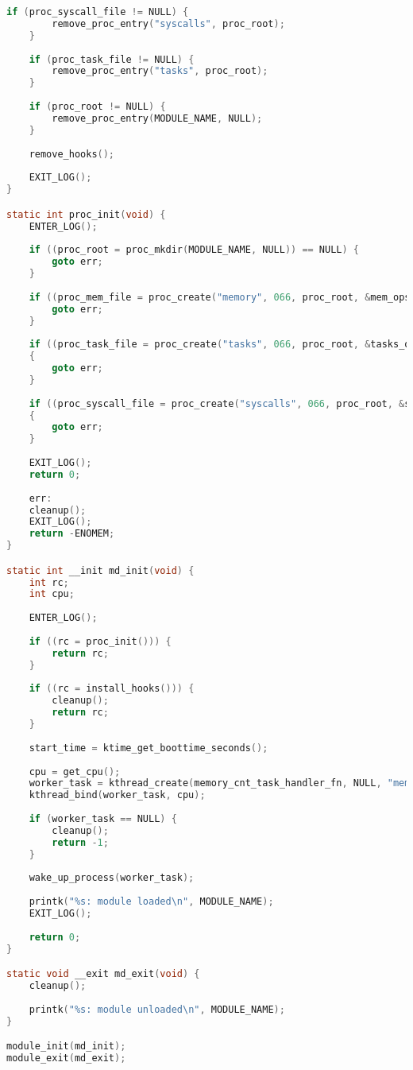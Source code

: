 \begin{lstlisting}[label=lst:monitor_main, caption=Листинг файла monitor\_main.c, language=c]
	if (proc_syscall_file != NULL) {
		remove_proc_entry("syscalls", proc_root);
	}
	
	if (proc_task_file != NULL) {
		remove_proc_entry("tasks", proc_root);
	}
	
	if (proc_root != NULL) {
		remove_proc_entry(MODULE_NAME, NULL);
	}
	
	remove_hooks();
	
	EXIT_LOG();
}

static int proc_init(void) {
	ENTER_LOG();
	
	if ((proc_root = proc_mkdir(MODULE_NAME, NULL)) == NULL) {
		goto err;
	}
	
	if ((proc_mem_file = proc_create("memory", 066, proc_root, &mem_ops)) == NULL) {
		goto err;
	}
	
	if ((proc_task_file = proc_create("tasks", 066, proc_root, &tasks_ops)) == NULL)
	{
		goto err;
	}
	
	if ((proc_syscall_file = proc_create("syscalls", 066, proc_root, &syscalls_ops)) == NULL)
	{
		goto err;
	}
	
	EXIT_LOG();
	return 0;
	
	err:
	cleanup();
	EXIT_LOG();
	return -ENOMEM;
}

static int __init md_init(void) {
	int rc;
	int cpu;
	
	ENTER_LOG();
	
	if ((rc = proc_init())) {
		return rc;
	}
	
	if ((rc = install_hooks())) {
		cleanup();
		return rc;
	}
	
	start_time = ktime_get_boottime_seconds();
	
	cpu = get_cpu();
	worker_task = kthread_create(memory_cnt_task_handler_fn, NULL, "memory counter thread");
	kthread_bind(worker_task, cpu);
	
	if (worker_task == NULL) {
		cleanup();
		return -1;
	}
	
	wake_up_process(worker_task);
	
	printk("%s: module loaded\n", MODULE_NAME);
	EXIT_LOG();
	
	return 0;
}

static void __exit md_exit(void) { 
	cleanup();
	
	printk("%s: module unloaded\n", MODULE_NAME); 
}

module_init(md_init);
module_exit(md_exit);
\end{lstlisting}


